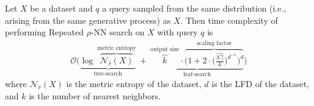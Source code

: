 \begin{theorem} Let $X$ be a dataset and $q$ a query sampled from the same distribution (i.e., arising from the same generative process) as $X$. Then time complexity of performing Repeated $\rho$-NN search on $X$ with query $q$ is \begin{gather}
        \mathcal{O}
        \Bigg(
            \underbrace{
                \log~\overbrace{\mathcal{N}_{\hat{r}}(X)}^{\textrm{metric entropy}}
            }_{\textrm{tree-search}}
            \ + \
            \underbrace{
                \overbrace{k}^{\textrm{output size}} \cdot
                \overbrace{\bigg( 1 + 2 \cdot \Big( \frac{\hat{|C|}}{k} \Big) ^ {d^{-1}} \bigg)^d}^{\textrm{scaling factor}}
            }_{\textrm{leaf-search}}
        \Bigg)
        \label{eq:methods:repeated-rnn-complexity1}
    \end{gather}
    where $\mathcal{N}_{\hat{r}}(X)$ is the metric entropy of the dataset, $d$ is the LFD of the dataset, and $k$ is the number of nearest neighbors. 
\end{theorem}


